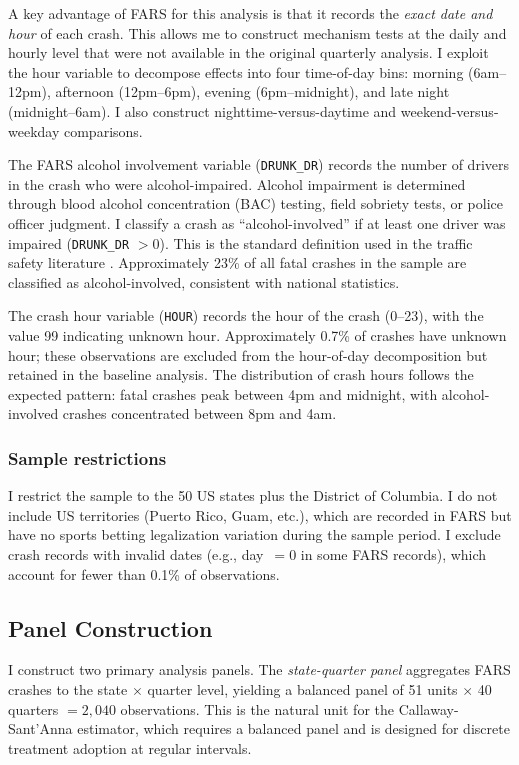 \documentclass[12pt]{article}
\begin{document}
A key advantage of FARS for this analysis is that it records the \textit{exact date and hour} of each crash. This allows me to construct mechanism tests at the daily and hourly level that were not available in the original quarterly analysis. I exploit the hour variable to decompose effects into four time-of-day bins: morning (6am--12pm), afternoon (12pm--6pm), evening (6pm--midnight), and late night (midnight--6am). I also construct nighttime-versus-daytime and weekend-versus-weekday comparisons.

The FARS alcohol involvement variable (\texttt{DRUNK\_DR}) records the number of drivers in the crash who were alcohol-impaired. Alcohol impairment is determined through blood alcohol concentration (BAC) testing, field sobriety tests, or police officer judgment. I classify a crash as ``alcohol-involved'' if at least one driver was impaired (\texttt{DRUNK\_DR} $> 0$). This is the standard definition used in the traffic safety literature \citep{Levitt2001, Ruhm1996}. Approximately 23\% of all fatal crashes in the sample are classified as alcohol-involved, consistent with national statistics.

The crash hour variable (\texttt{HOUR}) records the hour of the crash (0--23), with the value 99 indicating unknown hour. Approximately 0.7\% of crashes have unknown hour; these observations are excluded from the hour-of-day decomposition but retained in the baseline analysis. The distribution of crash hours follows the expected pattern: fatal crashes peak between 4pm and midnight, with alcohol-involved crashes concentrated between 8pm and 4am.

\subsubsection*{Sample restrictions} I restrict the sample to the 50 US states plus the District of Columbia. I do not include US territories (Puerto Rico, Guam, etc.), which are recorded in FARS but have no sports betting legalization variation during the sample period. I exclude crash records with invalid dates (e.g., day~$= 0$ in some FARS records), which account for fewer than 0.1\% of observations.

\subsection{Panel Construction}

I construct two primary analysis panels. The \textit{state-quarter panel} aggregates FARS crashes to the state $\times$ quarter level, yielding a balanced panel of 51 units $\times$ 40 quarters $= 2{,}040$ observations. This is the natural unit for the Callaway-Sant'Anna estimator, which requires a balanced panel and is designed for discrete treatment adoption at regular intervals.
\end{document}
